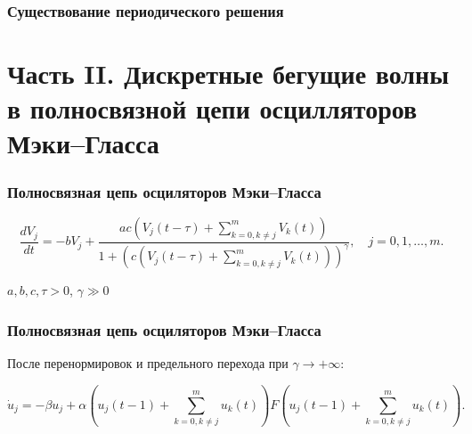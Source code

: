 \begin{frame}
	\frametitle{Существование периодического решения}
	
	
\end{frame}

\section{Часть II. Дискретные бегущие волны в полносвязной цепи осцилляторов Мэки--Гласса}


\begin{frame}
	\frametitle{Полносвязная цепь осциляторов Мэки--Гласса}
	
	\begin{equation*}
		\label{eq:system_full_generators}
		\dfrac{d V_{j}}{dt}=- bV_{j} + \dfrac{ac\left(V_{j}(t - \tau) + \sum\limits_{k = 0, k\neq j}^{m}V_{k}(t)\right)}{1 + \left(c\left(V_{j}(t - \tau) + \sum\limits_{k = 0, k\neq j}^{m}V_{k}(t)\right)\right)^{\gamma}}, \quad j=0,1,\ldots,m.
	\end{equation*}
	
	$a, b, c, \tau > 0$, $\gamma \gg 0$
\end{frame}

\begin{frame}
	\frametitle{Полносвязная цепь осциляторов Мэки--Гласса}
	
	После перенормировок и предельного перехода при $\gamma \to +\infty$:
	
	\begin{equation*}
		\dot{u}_j=-\beta u_j+\alpha\left(u_j(t-1)+ \sum\limits_{k=0, k\neq j}^{m} u_{k}(t)\right)F\left(u_j(t-1)+\sum\limits_{k=0, k\neq j}^{m} u_{k}(t)\right).
	\end{equation*}

\end{frame}


